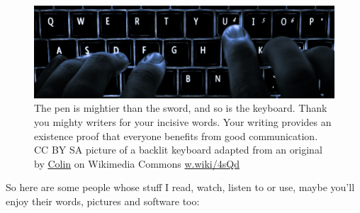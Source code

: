 \documentclass[
]{book}
\begin{document}
\begin{figure}

{\centering \includegraphics[width=1\linewidth]{images/keyboard} 

}

\caption{The pen is mightier than the sword, and so is the keyboard. Thank you mighty writers for your incisive words. Your writing provides an existence proof that everyone benefits from good communication. CC BY SA picture of a backlit keyboard adapted from an original by \href{https://commons.wikimedia.org/wiki/User:Colin}{Colin} on Wikimedia Commons \href{https://w.wiki/4sQd}{w.wiki/4sQd}}\label{fig:keyboard-fig}
\end{figure}



So here are some people whose stuff I read, watch, listen to or use, maybe you'll enjoy their words, pictures and software too:
\end{document}
